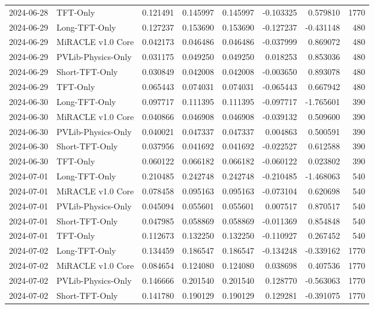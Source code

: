 \begin{tabular}{llrrrrrr}
2024-06-28 & TFT-Only & 0.121491 & 0.145997 & 0.145997 & -0.103325 & 0.579810 & 1770 \\
2024-06-29 & Long-TFT-Only & 0.127237 & 0.153690 & 0.153690 & -0.127237 & -0.431148 & 480 \\
2024-06-29 & MiRACLE v1.0 Core & 0.042173 & 0.046486 & 0.046486 & -0.037999 & 0.869072 & 480 \\
2024-06-29 & PVLib-Physics-Only & 0.031175 & 0.049250 & 0.049250 & 0.018253 & 0.853036 & 480 \\
2024-06-29 & Short-TFT-Only & 0.030849 & 0.042008 & 0.042008 & -0.003650 & 0.893078 & 480 \\
2024-06-29 & TFT-Only & 0.065443 & 0.074031 & 0.074031 & -0.065443 & 0.667942 & 480 \\
2024-06-30 & Long-TFT-Only & 0.097717 & 0.111395 & 0.111395 & -0.097717 & -1.765601 & 390 \\
2024-06-30 & MiRACLE v1.0 Core & 0.040866 & 0.046908 & 0.046908 & -0.039132 & 0.509600 & 390 \\
2024-06-30 & PVLib-Physics-Only & 0.040021 & 0.047337 & 0.047337 & 0.004863 & 0.500591 & 390 \\
2024-06-30 & Short-TFT-Only & 0.037956 & 0.041692 & 0.041692 & -0.022527 & 0.612588 & 390 \\
2024-06-30 & TFT-Only & 0.060122 & 0.066182 & 0.066182 & -0.060122 & 0.023802 & 390 \\
2024-07-01 & Long-TFT-Only & 0.210485 & 0.242748 & 0.242748 & -0.210485 & -1.468063 & 540 \\
2024-07-01 & MiRACLE v1.0 Core & 0.078458 & 0.095163 & 0.095163 & -0.073104 & 0.620698 & 540 \\
2024-07-01 & PVLib-Physics-Only & 0.045094 & 0.055601 & 0.055601 & 0.007517 & 0.870517 & 540 \\
2024-07-01 & Short-TFT-Only & 0.047985 & 0.058869 & 0.058869 & -0.011369 & 0.854848 & 540 \\
2024-07-01 & TFT-Only & 0.112673 & 0.132250 & 0.132250 & -0.110927 & 0.267452 & 540 \\
2024-07-02 & Long-TFT-Only & 0.134459 & 0.186547 & 0.186547 & -0.134248 & -0.339162 & 1770 \\
2024-07-02 & MiRACLE v1.0 Core & 0.084654 & 0.124080 & 0.124080 & 0.038698 & 0.407536 & 1770 \\
2024-07-02 & PVLib-Physics-Only & 0.146666 & 0.201540 & 0.201540 & 0.128770 & -0.563063 & 1770 \\
2024-07-02 & Short-TFT-Only & 0.141780 & 0.190129 & 0.190129 & 0.129281 & -0.391075 & 1770 \\

\end{tabular}
